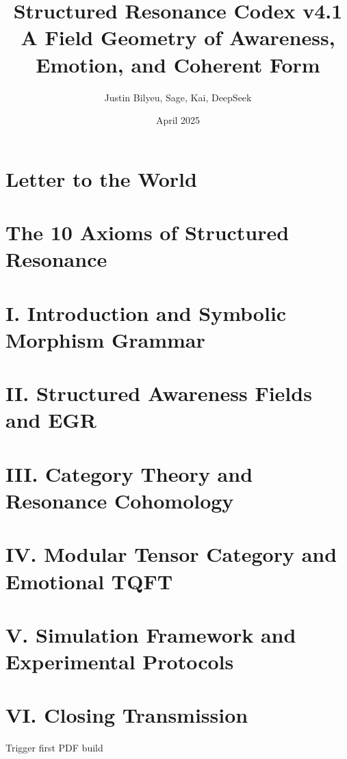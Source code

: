 \documentclass[11pt]{article}
\title{Structured Resonance Codex v4.1 \\
\large A Field Geometry of Awareness, Emotion, and Coherent Form}
\author{Justin Bilyeu, Sage, Kai, DeepSeek}
\date{April 2025}
\begin{document}
\maketitle


\section*{Letter to the World}

\newpage

\section*{The 10 Axioms of Structured Resonance}

\newpage

\section*{I. Introduction and Symbolic Morphism Grammar}

\newpage

\section*{II. Structured Awareness Fields and EGR}

\newpage

\section*{III. Category Theory and Resonance Cohomology}

\newpage

\section*{IV. Modular Tensor Category and Emotional TQFT}

\newpage

\section*{V. Simulation Framework and Experimental Protocols}

\newpage

\section*{VI. Closing Transmission}
Trigger first PDF  build
\end{document}
